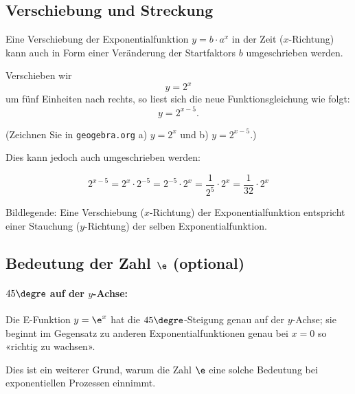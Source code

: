 \newpage


\subsection{Verschiebung und Streckung }

Eine Verschiebung der Exponentialfunktion $y=b\cdot{}a^x$ in der Zeit ($x$-Richtung) kann auch in Form einer Veränderung der Startfaktors $b$ umgeschrieben werden.

Verschieben wir \zB $$y=2^x$$ um fünf Einheiten nach rechts, so liest sich die neue Funktionsgleichung wie folgt:
$$y=2^{x-5}.$$

(Zeichnen Sie in \texttt{geogebra.org} a) $y=2^x$ und b) $y=2^{x-5}$.)

Dies kann jedoch auch umgeschrieben werden:

$$2^{x-5} = 2^x \cdot{} 2^{-5} = 2^{-5} \cdot{} 2^x = \frac{1}{2^5} \cdot{} 2^x =
\frac{1}{32}\cdot{}2^x$$

Bildlegende: Eine Verschiebung ($x$-Richtung) der Exponentialfunktion entspricht einer Stauchung ($y$-Richtung) der selben Exponentialfunktion.


\newpage

\subsection{Bedeutung der Zahl $\e$ (optional)}

\paragraph{$45\degre$ auf der $y$-Achse:}
Die E-Funktion $y=\e^x$ hat die $45\degre$-Steigung genau auf der $y$-Achse; sie beginnt im Gegensatz zu anderen Exponentialfunktionen genau bei $x=0$ so «richtig zu wachsen».


Dies ist ein weiterer Grund, warum die Zahl $\e$ eine solche Bedeutung bei
exponentiellen Prozessen einnimmt.



